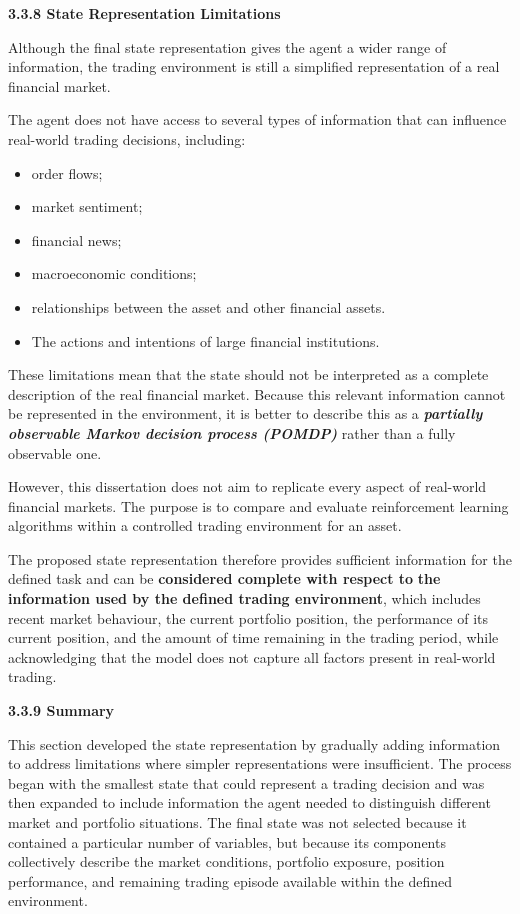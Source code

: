 \textbf{3.3.8 State Representation Limitations}

Although the final state representation gives the agent a wider range of
information, the trading environment is still a simplified
representation of a real financial market.

The agent does not have access to several types of information that can
influence real-world trading decisions, including:

\begin{itemize}
\item
  order flows;
\item
  market sentiment;
\item
  financial news;
\item
  macroeconomic conditions;
\item
  relationships between the asset and other financial assets.
\item
  The actions and intentions of large financial institutions.
\end{itemize}

These limitations mean that the state should not be interpreted as a
complete description of the real financial market. Because this relevant
information cannot be represented in the environment, it is better to
describe this as a \emph{\textbf{partially observable Markov decision
process (POMDP)}} rather than a fully observable one.

However, this dissertation does not aim to replicate every aspect of
real-world financial markets. The purpose is to compare and evaluate
reinforcement learning algorithms within a controlled trading
environment for an asset.

The proposed state representation therefore provides sufficient
information for the defined task and can be \textbf{considered complete
with respect to} \textbf{the information used by the defined trading
environment}, which includes recent market behaviour, the current
portfolio position, the performance of its current position, and the
amount of time remaining in the trading period, while acknowledging that
the model does not capture all factors present in real-world trading.

\textbf{3.3.9 Summary}

This section developed the state representation by gradually adding
information to address limitations where simpler representations were
insufficient. The process began with the smallest state that could
represent a trading decision and was then expanded to include
information the agent needed to distinguish different market and
portfolio situations. The final state was not selected because it
contained a particular number of variables, but because its components
collectively describe the market conditions, portfolio exposure,
position performance, and remaining trading episode available within the
defined environment.

